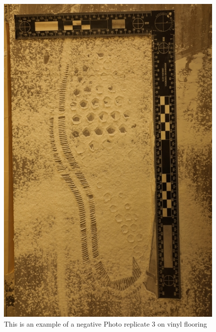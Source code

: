 \begin{figure}[!htp]
\centering
\includegraphics[scale=1.3]{Vinyl3.png}
\caption{This is an example of a negative Photo replicate 3 on vinyl flooring}
\label{Figure 8}
\end{figure}

